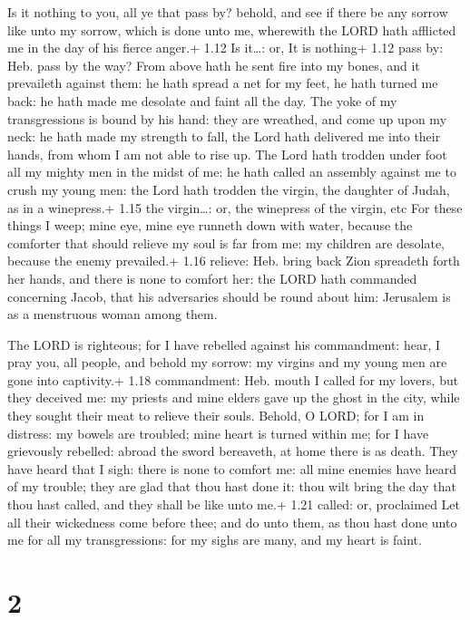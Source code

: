  Is it nothing to you, all ye that pass by? behold, and
see if there be any sorrow like unto my sorrow, which is done unto me,
wherewith the LORD hath afflicted me in the day of his fierce anger.+
1.12 Is it\ldots: or, It is nothing+ 1.12 pass by: Heb. pass by the way?
 From above hath he sent fire into my bones, and it
prevaileth against them: he hath spread a net for my feet, he hath
turned me back: he hath made me desolate and faint all the day.
 The yoke of my transgressions is bound by his hand: they
are wreathed, and come up upon my neck: he hath made my strength to
fall, the Lord hath delivered me into their hands, from whom I am not
able to rise up.  The Lord hath trodden under foot all my
mighty men in the midst of me: he hath called an assembly against me to
crush my young men: the Lord hath trodden the virgin, the daughter of
Judah, as in a winepress.+ 1.15 the virgin\ldots: or, the winepress of
the virgin, etc  For these things I weep; mine eye, mine
eye runneth down with water, because the comforter that should relieve
my soul is far from me: my children are desolate, because the enemy
prevailed.+ 1.16 relieve: Heb. bring back  Zion spreadeth
forth her hands, and there is none to comfort her: the LORD hath
commanded concerning Jacob, that his adversaries should be round about
him: Jerusalem is as a menstruous woman among them.

 The LORD is righteous; for I have rebelled against his
commandment: hear, I pray you, all people, and behold my sorrow: my
virgins and my young men are gone into captivity.+ 1.18 commandment:
Heb. mouth  I called for my lovers, but they deceived me:
my priests and mine elders gave up the ghost in the city, while they
sought their meat to relieve their souls.  Behold, O LORD;
for I am in distress: my bowels are troubled; mine heart is turned
within me; for I have grievously rebelled: abroad the sword bereaveth,
at home there is as death.  They have heard that I sigh:
there is none to comfort me: all mine enemies have heard of my trouble;
they are glad that thou hast done it: thou wilt bring the day that thou
hast called, and they shall be like unto me.+ 1.21 called: or,
proclaimed  Let all their wickedness come before thee; and
do unto them, as thou hast done unto me for all my transgressions: for
my sighs are many, and my heart is faint.

\hypertarget{section-1}{%
\section{2}\label{section-1}}

